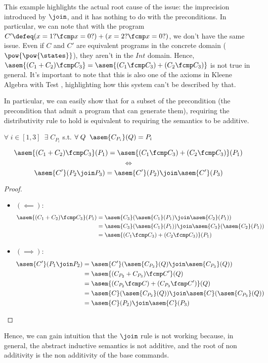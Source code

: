 This example highlights the actual root cause of the issue: the imprecision
introduced by $\join$, and it has nothing to do with the preconditions. In
particular, we can note that with the program $C' \defeq (x = 1? \fcmp x = 0?)
+ (x = 2? \fcmp x = 0?)$, we don't have the same issue. Even if $C$ and $C'$
are equivalent programs in the concrete domain ($\pow{\pow{\states}}$), they
aren't in the $Int$ domain. Hence, $\asem{(C_1 + C_2) \fcmp C_3} = \asem{(C_1
\fcmp C_3) + (C_2 \fcmp C_3)}$ is not true in general. It's important to note
that this is also one of the axioms in Kleene Algebra with Test \cite{Kozen97},
highlighting how this system can't be described by that.

In particular, we can easily show that for a subset of the precondition (the
precondition that admit a program that can generate them), requiring the
distributivity rule to hold is equivalent to requiring the semantics to be
additive.

\begin{theorem} $\;$\\
  $\forall \; i \in [1, 3] \;\; \exists \; C_{P_i}$ s.t. 
  $\forall \; Q \;\; \asem{C_{P_i}}(Q) = P_i$

  $$\asem{(C_1 + C_2) \fcmp C_3}(P_1) = \asem{(C_1 \fcmp C_3) + (C_2 \fcmp C_3)}(P_1)$$
  $$\iff$$
  $$\asem{C'}(P_2 \join P_3) = \asem{C'}(P_2) \join \asem{C'}(P_3)$$
\end{theorem}
\begin{proof} $\;$\\
  \begin{itemize}
    \item $(\impliedby)$:
      \begin{align*}
        \asem{(C_1 + C_2) \fcmp C_3}(P_1)
          &= \asem{C_3}(\asem{C_1}(P_1) \join \asem{C_2}(P_1)) \\
          &= \asem{C_3}(\asem{C_1}(P_1)) \join \asem{C_3}(\asem{C_2}(P_1)) \\
          &= \asem{(C_1 \fcmp C_3) + (C_2 \fcmp C_3)}(P_1)
      \end{align*}
    \item $(\implies)$:
      \begin{align*}
        \asem{C'}(P_1 \join P_2) 
          &= \asem{C'}(\asem{C_{P_2}}(Q) \join \asem{C_{P_3}}(Q)) \\
          &= \asem{(C_{P_2} + C_{P_3}) \fcmp C'}(Q) \\
          &= \asem{(C_{P_2} \fcmp C) + (C_{P_3} \fcmp C')}(Q) \\
          &= \asem{C}(\asem{C_{P_2}}(Q)) \join \asem{C}(\asem{C_{P_3}}(Q)) \\
          &= \asem{C}(P_2) \join \asem{C}(P_3)
      \end{align*}
  \end{itemize}
\end{proof}

Hence, we can gain intuition that the $\join$ rule is not working because, in
general, the abstract inductive semantics is not additive, and the root of non
additivity is the non additivity of the base commands.
